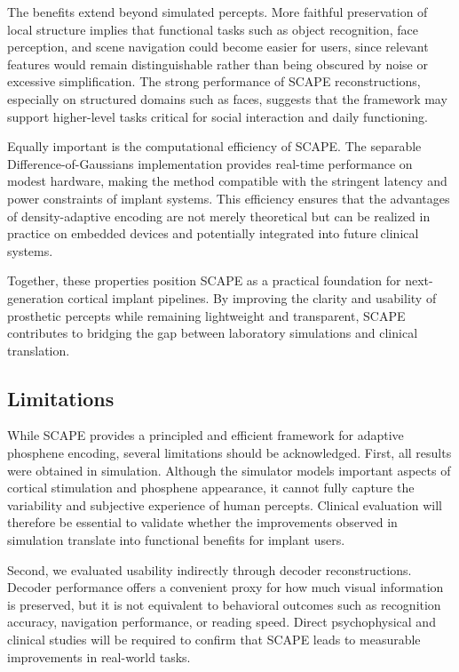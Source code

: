 The benefits extend beyond simulated percepts. More faithful preservation of local structure implies that functional tasks such as object recognition, face perception, and scene navigation could become easier for users, since relevant features would remain distinguishable rather than being obscured by noise or excessive simplification. The strong performance of SCAPE reconstructions, especially on structured domains such as faces, suggests that the framework may support higher-level tasks critical for social interaction and daily functioning.

Equally important is the computational efficiency of SCAPE. The separable Difference-of-Gaussians implementation provides real-time performance on modest hardware, making the method compatible with the stringent latency and power constraints of implant systems. This efficiency ensures that the advantages of density-adaptive encoding are not merely theoretical but can be realized in practice on embedded devices and potentially integrated into future clinical systems.

Together, these properties position SCAPE as a practical foundation for next-generation cortical implant pipelines. By improving the clarity and usability of prosthetic percepts while remaining lightweight and transparent, SCAPE contributes to bridging the gap between laboratory simulations and clinical translation.

\subsection{Limitations}
While SCAPE provides a principled and efficient framework for adaptive phosphene encoding, several limitations should be acknowledged. First, all results were obtained in simulation. Although the simulator models important aspects of cortical stimulation and phosphene appearance, it cannot fully capture the variability and subjective experience of human percepts. Clinical evaluation will therefore be essential to validate whether the improvements observed in simulation translate into functional benefits for implant users.

Second, we evaluated usability indirectly through decoder reconstructions. Decoder performance offers a convenient proxy for how much visual information is preserved, but it is not equivalent to behavioral outcomes such as recognition accuracy, navigation performance, or reading speed. Direct psychophysical and clinical studies will be required to confirm that SCAPE leads to measurable improvements in real-world tasks.

